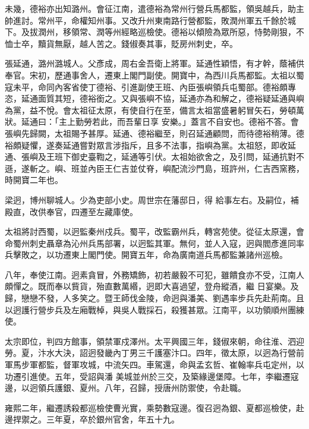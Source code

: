 \begin{pinyinscope}
 未幾，德裕亦出知潞州。會征江南，遣德裕為常州行營兵馬都監，領吳越兵，助主帥進討。常州平，命權知州事。又改升州東南路行營都監，敗潤州軍五千餘於城下。及拔潤州，移領常、潤等州經略巡檢使。德裕以傾險為眾所惡，恃勢剛狠，不恤士卒，黷貨無厭，越人苦之。錢俶奏其事，貶房州刺史，卒。



 張延通，潞州潞城人。父彥成，周右金吾衛上將軍。延通性穎悟，有才幹，蔭補供奉官。宋初，歷通事舍人，遷東上閣門副使。開寶中，為西川兵馬都監。太祖以蜀寇未平，命同內客省使丁德裕、引進副使王班、內臣張嶼領兵屯蜀部。德裕頗專恣，延通面質其短，德裕銜之。又與張嶼不協，延通亦為和解之，德裕疑延通與嶼為黨，益不悅。會太祖征太原，有使自行在至，備言太祖當盛暑躬冒矢石，勞頓萬狀。延通曰：「主上勤勞若此，而吾輩日享
 安樂。」蓋言不自安也。德裕不答。會張嶼先歸闕，太祖賜予甚厚。延通、德裕繼至，則召延通顧問，而待德裕稍薄。德裕頗疑懼，遂奏延通嘗對眾言涉指斥，且多不法事，指嶼為黨。太祖怒，即收延通、張嶼及王班下御史臺鞫之，延通等引伏。太祖始欲舍之，及引問，延通抗對不遜，遂斬之。嶼、班並內臣王仁吉並仗脊，嶼配流沙門島，班許州，仁吉西窯務，時開寶二年也。



 梁迥，博州聊城人。少為吏部小史。周世宗在藩邸日，得
 給事左右。及嗣位，補殿直，改供奉官，四遷至左藏庫使。



 太祖將討西蜀，以迥監秦州戍兵。蜀平，改監霸州兵，轉宮苑使。從征太原還，會命蜀州刺史聶章為沁州兵馬部署，以迥監其軍。無何，並人入寇，迥與閻彥進同率兵擊敗之，以功遷東上閣門使。開寶五年，命為廣南道兵馬都監兼諸州巡檢。



 八年，奉使江南。迥素貪冒，外務矯飾，初若嚴毅不可犯，雖饋食亦不受，江南人頗憚之。既而奉以貲貨，殆直數萬緡，迥即大喜過望，登舟縱酒，繼
 日宴樂。及歸，戀戀不發，人多笑之。暨王師伐金陵，命迥與潘美、劉遇率步兵先赴荊南。且以迥護行營步兵及左廂戰棹，與吳人戰採石，殺獲甚眾。江南平，以功領順州團練使。



 太宗即位，判四方館事，領禁軍戍澤州。太平興國三年，錢俶來朝，命往淮、泗迎勞。夏，汴水大決，詔迥發畿內丁男三千護塞汴口。四年，徵太原，以迥為行營前軍馬步軍都監，督軍攻城，中流矢四。車駕還，命與孟玄哲、崔翰率兵屯定州，以功遷引進使。五年，受詔與潘
 美城並州於三交，及築緣邊堡障。七年，李繼遷寇邊，以迥領兵護銀、夏州。八年，召歸，授唐州防禦使，令赴職。



 雍熙二年，繼遷誘殺都巡檢使曹光實，乘勢數寇邊。復召迥為銀、夏都巡檢使，赴邊捍禦之。三年夏，卒於銀州官舍，年五十九。




\end{pinyinscope}
